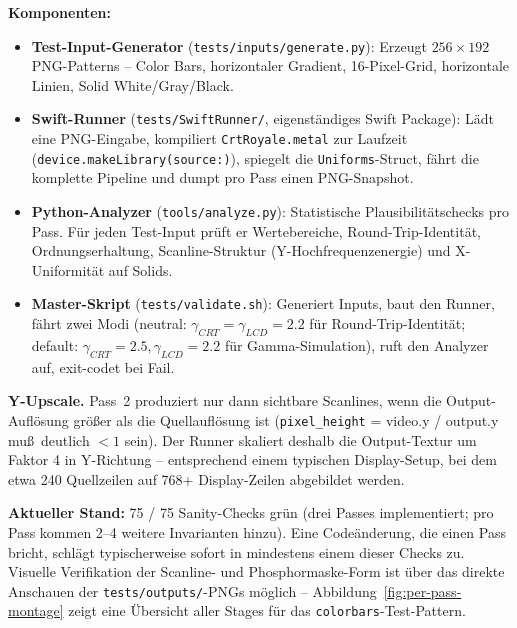 \documentclass[11pt, a4paper]{article}
\begin{document}
\vspace{.25cm}
\textbf{Komponenten:}
\begin{itemize}[leftmargin=*, nosep]
    \item \textbf{Test-Input-Generator} (\texttt{tests/inputs/generate.py}): Erzeugt $256\times192$ PNG-Patterns -- Color Bars, horizontaler Gradient, 16-Pixel-Grid, horizontale Linien, Solid White/Gray/Black. \\
    \item \textbf{Swift-Runner} (\texttt{tests/SwiftRunner/}, eigenst\"andiges Swift Package): L\"adt eine PNG-Eingabe, kompiliert \texttt{CrtRoyale.metal} zur Laufzeit (\texttt{device.makeLibrary(source:)}), spiegelt die \texttt{Uniforms}-Struct, f\"ahrt die komplette Pipeline und dumpt pro Pass einen PNG-Snapshot. \\
    \item \textbf{Python-Analyzer} (\texttt{tools/analyze.py}): Statistische Plausibilit\"atschecks pro Pass. F\"ur jeden Test-Input pr\"uft er Wertebereiche, Round-Trip-Identit\"at, Ordnungserhaltung, Scanline-Struktur (Y-Hochfrequenzenergie) und X-Uniformit\"at auf Solids. \\
    \item \textbf{Master-Skript} (\texttt{tests/validate.sh}): Generiert Inputs, baut den Runner, f\"ahrt zwei Modi (neutral: $\gamma_{CRT}=\gamma_{LCD}=2.2$ f\"ur Round-Trip-Identit\"at; default: $\gamma_{CRT}=2.5,\gamma_{LCD}=2.2$ f\"ur Gamma-Simulation), ruft den Analyzer auf, exit-codet bei Fail.
\end{itemize}

\vspace{.25cm}
\textbf{Y-Upscale.} Pass~2 produziert nur dann sichtbare Scanlines, wenn die Output-Aufl\"osung gr\"o\ss er als die Quellaufl\"osung ist (\texttt{pixel\_height} = video.y / output.y mu\ss\ deutlich $<1$ sein). Der Runner skaliert deshalb die Output-Textur um Faktor 4 in Y-Richtung -- entsprechend einem typischen Display-Setup, bei dem etwa 240 Quellzeilen auf 768+ Display-Zeilen abgebildet werden.

\vspace{.25cm}
\textbf{Aktueller Stand:} 75 / 75 Sanity-Checks gr\"un (drei Passes implementiert; pro Pass kommen 2--4 weitere Invarianten hinzu). Eine Code\"anderung, die einen Pass bricht, schl\"agt typischerweise sofort in mindestens einem dieser Checks zu. Visuelle Verifikation der Scanline- und Phosphormaske-Form ist \"uber das direkte Anschauen der \texttt{tests/outputs/}-PNGs m\"oglich -- Abbildung~\ref{fig:per-pass-montage} zeigt eine \"Ubersicht aller Stages f\"ur das \texttt{colorbars}-Test-Pattern.
\end{document}
